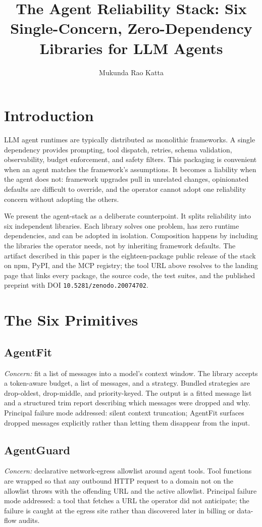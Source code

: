 \documentclass[sigconf,review]{acmart}
\title{The Agent Reliability Stack: Six Single-Concern, Zero-Dependency Libraries for LLM Agents}
\author{Mukunda Rao Katta}
\affiliation{%
  \institution{Independent Researcher}
  \country{}
}
\begin{document}
\maketitle

\section{Introduction}

LLM agent runtimes are typically distributed as monolithic frameworks. A single dependency provides prompting, tool dispatch, retries, schema validation, observability, budget enforcement, and safety filters. This packaging is convenient when an agent matches the framework's assumptions. It becomes a liability when the agent does not: framework upgrades pull in unrelated changes, opinionated defaults are difficult to override, and the operator cannot adopt one reliability concern without adopting the others.

We present the agent-stack as a deliberate counterpoint. It splits reliability into six independent libraries. Each library solves one problem, has zero runtime dependencies, and can be adopted in isolation. Composition happens by including the libraries the operator needs, not by inheriting framework defaults. The artifact described in this paper is the eighteen-package public release of the stack on npm, PyPI, and the MCP registry; the tool URL above resolves to the landing page that links every package, the source code, the test suites, and the published preprint with DOI \texttt{10.5281/zenodo.20074702}.

\section{The Six Primitives}

\subsection{AgentFit}
\textit{Concern:} fit a list of messages into a model's context window. The library accepts a token-aware budget, a list of messages, and a strategy. Bundled strategies are drop-oldest, drop-middle, and priority-keyed. The output is a fitted message list and a structured trim report describing which messages were dropped and why. Principal failure mode addressed: silent context truncation; AgentFit surfaces dropped messages explicitly rather than letting them disappear from the input.

\subsection{AgentGuard}
\textit{Concern:} declarative network-egress allowlist around agent tools. Tool functions are wrapped so that any outbound HTTP request to a domain not on the allowlist throws with the offending URL and the active allowlist. Principal failure mode addressed: a tool that fetches a URL the operator did not anticipate; the failure is caught at the egress site rather than discovered later in billing or data-flow audits.
\end{document}
